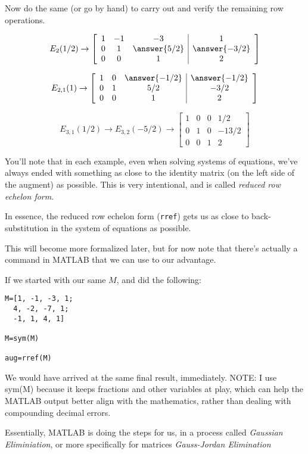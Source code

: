 \documentclass{ximera}
\begin{document}
Now do the same (or go by hand) to carry out and verify the remaining row operations.

\[
E_{2}(1/2)\rightarrow
\left[\begin{array}{ccc|c} 
  1&-1&-3&1\\0&1&\answer{5/2}&\answer{-3/2}\\0&0&1&2
  \end{array}\right]
\]

\[
E_{2,1}(1)\rightarrow
\left[\begin{array}{ccc|c} 
  1&0&\answer{-1/2}&\answer{-1/2}\\0&1&5/2&-3/2\\0&0&1&2
  \end{array}\right]
\]


\[
E_{3,1}(1/2)\rightarrow E_{3,2}(-5/2)\rightarrow
\left[\begin{array}{ccc|c} 
  1&0&0&1/2\\0&1&0&-13/2\\0&0&1&2
  \end{array}\right]
\]

 
\begin{remark}

  You'll note that in each example, even when solving systems of equations, we've always ended with something as close to the identity matrix (on the left side of the augment) as possible. This is very intentional, and is called \emph{reduced row echelon form}.

  In essence, the reduced row echelon form (\texttt{rref}) gets us as close to back-substitution in the system of equations as possible. 

  This will become more formalized later, but for now note that there's actually a command in MATLAB that we can use to our advantage. 

  If we started with our same $M$, and did the following:

  \begin{verbatim}
M=[1, -1, -3, 1;
  4, -2, -7, 1;
  -1, 1, 4, 1]

M=sym(M)

aug=rref(M)
  \end{verbatim}

  We would have arrived at the same final result, immediately. NOTE: I use sym(M) because it keeps fractions and other variables at play, which can help the MATLAB output better align with the mathematics, rather than dealing with compounding decimal errors. 
  
  Essentially, MATLAB is doing the steps for us, in a process called \emph{Gaussian Eliminiation}, or more specifically for matrices \emph{Gauss-Jordan Elimination}

\end{remark}
\end{document}
